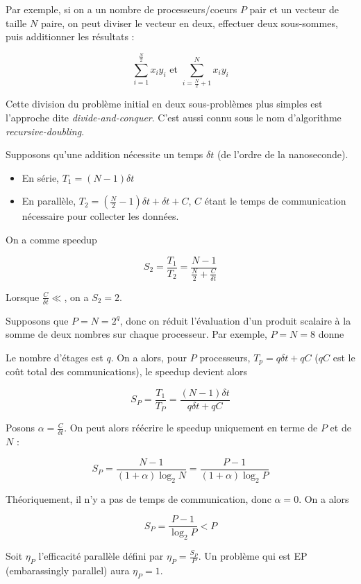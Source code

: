 Par exemple, si on a un nombre de processeurs/coeurs $P$ pair et un vecteur de taille $N$ paire, on peut diviser le vecteur en deux, effectuer deux sous-sommes, puis additionner les résultats :

$$\sum_{i = 1}^{\frac{N}{2}} x_i y_i \text{ et } \sum_{i = \frac{N}{2} + 1}^N x_i y_i$$

Cette division du problème initial en deux sous-problèmes plus simples est l'approche dite \textit{divide-and-conquer}. C'est aussi connu sous le nom d'algorithme \textit{recursive-doubling}.

Supposons qu'une addition nécessite un temps $\delta t$ (de l'ordre de la nanoseconde).

\begin{itemize}
	\item En série, $T_1 = (N - 1) \delta t$
	\item En parallèle, $T_2 = (\frac{N}{2} - 1) \delta t + \delta t + C$, $C$ étant le temps de communication nécessaire pour collecter les données.
\end{itemize}

On a comme speedup

$$S_2 = \frac{T_1}{T_2} = \frac{N - 1}{\frac{N}{2} + \frac{C}{\delta t}}$$

Lorsque $\frac{C}{\delta t} \ll$, on a $S_2 = 2$.

Supposons que $P = N = 2^q$, donc on réduit l'évaluation d'un produit scalaire à la somme de deux nombres sur chaque processeur. Par exemple, $P = N = 8$ donne


Le nombre d'étages est $q$. On a alors, pour $P$ processeurs, $T_p = q \delta t + q C$ ($qC$ est le coût total des communications), le speedup devient alors

$$S_P = \frac{T_1}{T_P}  = \frac{(N - 1) \delta t}{q \delta t + qC}$$

Posons $\alpha = \frac{C}{\delta t}$. On peut alors réécrire le speedup uniquement en terme de $P$ et de $N$ :


$$S_P = \frac{N - 1}{(1 + \alpha ) \log_2 N} = \frac{P - 1}{(1 + \alpha ) \log_2 P}$$

Théoriquement, il n'y a pas de temps de communication, donc $\alpha = 0$. On a alors

$$S_P = \frac{P - 1}{\log_2 P} < P$$

Soit $\eta_P$ l'efficacité parallèle défini par $\eta_P = \frac{S_P}{P}$. Un problème qui est EP (embarassingly parallel) aura $\eta_P = 1$.

